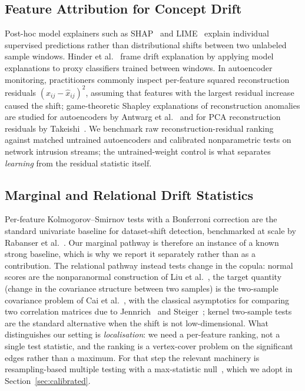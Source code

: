 \documentclass[10pt,conference]{IEEEtran}
\begin{document}
\subsection{Feature Attribution for Concept Drift}
Post-hoc model explainers such as SHAP~\cite{lundberg2017shap} and
LIME~\cite{ribeiro2016lime} explain individual supervised predictions rather
than distributional shifts between two unlabeled sample windows. Hinder et
al.~\cite{hinder2023explain} frame drift explanation by applying model
explanations to proxy classifiers trained between windows. In autoencoder
monitoring, practitioners
commonly inspect per-feature squared reconstruction residuals
$(x_{ij} - \hat{x}_{ij})^2$, assuming that features with the largest residual
increase caused the shift; game-theoretic Shapley explanations of reconstruction
anomalies are studied for autoencoders by Antwarg et al.~\cite{antwarg2021explaining}
and for PCA reconstruction residuals by Takeishi~\cite{takeishi2019reconstruction}.
We benchmark raw reconstruction-residual ranking against matched untrained
autoencoders and calibrated nonparametric tests on network intrusion streams; the
untrained-weight control is what separates \emph{learning} from the residual
statistic itself.

\subsection{Marginal and Relational Drift Statistics}
Per-feature Kolmogorov--Smirnov tests with a Bonferroni correction are the
standard univariate baseline for dataset-shift detection, benchmarked at scale
by Rabanser et al.~\cite{rabanser2019failing}. Our marginal pathway is therefore
an instance of a known strong baseline, which is why we report it separately
rather than as a contribution. The relational pathway instead tests change in
the copula: normal scores are the nonparanormal construction of Liu et
al.~\cite{liu2009nonparanormal}, the target quantity (change in the covariance
structure between two samples) is the two-sample covariance problem of Cai et
al.~\cite{cai2013twosample}, with the classical asymptotics for comparing two
correlation matrices due to Jennrich~\cite{jennrich1970asymptotic} and
Steiger~\cite{steiger1980testing}; kernel two-sample
tests~\cite{gretton2012kernel} are the standard alternative when the shift is
not low-dimensional. What
distinguishes our setting is \emph{localisation}: we need a per-feature ranking,
not a single test statistic, and the ranking is a vertex-cover problem on the
significant edges rather than a maximum. For that step the relevant machinery is
resampling-based multiple testing with a max-statistic null~\cite{westfall1993resampling},
which we adopt in Section~\ref{sec:calibrated}.
\end{document}
